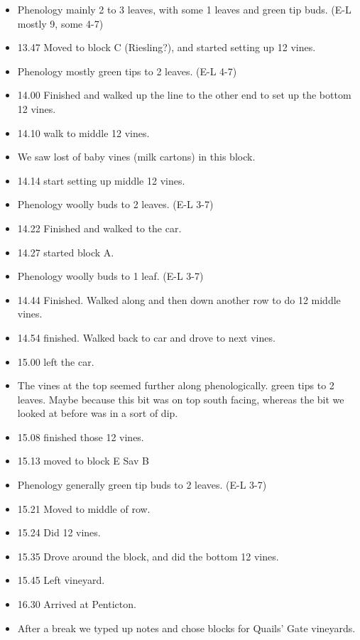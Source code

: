 \documentclass[11pt,letter]{article}
\newenvironment{smitemize}{
\begin{itemize}
  \setlength{\itemsep}{0pt}
  \setlength{\parskip}{0.8pt}
  \setlength{\parsep}{0pt}}
{\end{itemize}
}
\begin{document}
\begin{smitemize}
\item Phenology mainly 2 to 3 leaves, with some 1 leaves and green tip buds. (E-L mostly 9, some 4-7)  
\item 13.47 Moved to block C (Riesling?), and started setting up 12 vines.
\item Phenology mostly green tips to 2 leaves. (E-L 4-7)
\item 14.00 Finished and walked up the line to the other end to set up the bottom 12 vines. 
\item 14.10 walk to middle 12 vines. 
\item We saw lost of baby vines (milk cartons) in this block. 
\item 14.14 start setting up middle 12 vines.
\item Phenology woolly buds to 2 leaves. (E-L 3-7)
\item 14.22 Finished and walked to the car.
\item 14.27 started block A.
\item Phenology woolly buds to 1 leaf. (E-L 3-7)
\item 14.44 Finished. Walked along and then down another row to do 12 middle vines. 
\item 14.54 finished. Walked back to car and drove to next vines.
\item 15.00 left the car.
\item The vines at the top seemed further along phenologically. green tips to 2 leaves. Maybe because this bit was on top south facing, whereas the bit we looked at before was in a sort of dip.
\item 15.08 finished those 12 vines. 
\item 15.13 moved to block E Sav B
\item Phenology generally green tip buds to 2 leaves. (E-L 3-7)
\item 15.21 Moved to middle of row.
\item 15.24 Did 12 vines.
\item 15.35 Drove around the block, and did the bottom 12 vines.
\item 15.45 Left vineyard.
\item 16.30 Arrived at Penticton.
\item After a break we typed up notes and chose blocks for Quails' Gate vineyards.
\end{smitemize}
\end{document}
